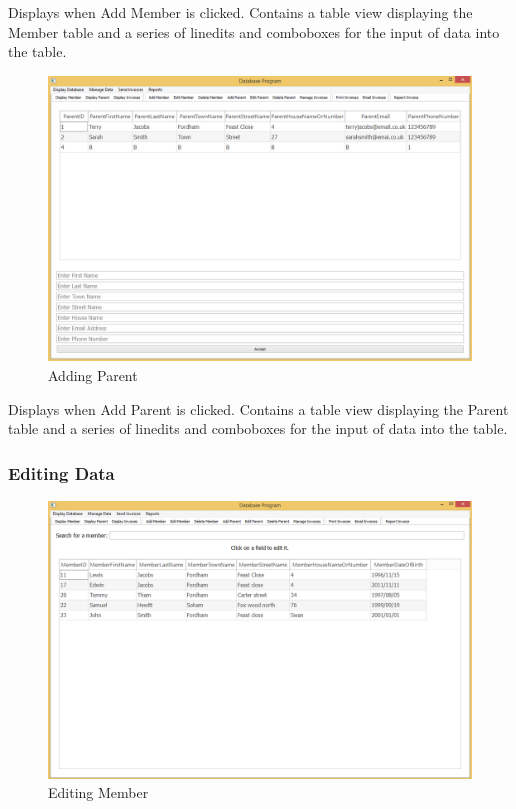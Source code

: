 Displays when Add Member is clicked. Contains a table view displaying the Member table and a series of linedits and comboboxes for the input of data into the table.

\begin{figure}[H]
\includegraphics[width=\textwidth]{./Maintenance/Images/AddParent.png}
    \caption{Adding Parent} \label{fig:add_parent}
\end{figure}

Displays when Add Parent is clicked. Contains a table view displaying the Parent table and a series of linedits and comboboxes for the input of data into the table.

\subsubsection{Editing Data}
\begin{figure}[H]
\includegraphics[width=\textwidth]{./Maintenance/Images/EditMember.png}
    \caption{Editing Member} \label{fig:edit_member}
\end{figure}


